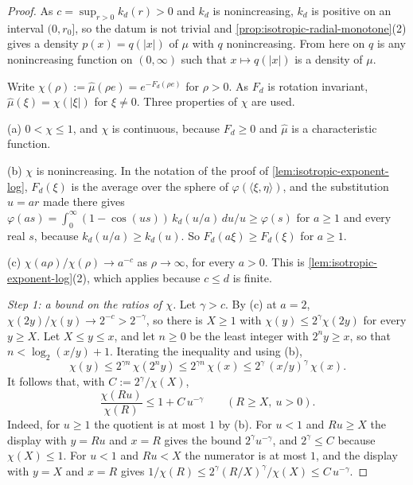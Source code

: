 \begin{proof}
\leanok
As $c = \sup_{r>0}k_d(r) > 0$ and $k_d$ is nonincreasing, $k_d$ is positive on an interval
$(0,r_0]$, so the datum is not trivial and \ref{prop:isotropic-radial-monotone}(2) gives a density
$p(x) = q(|x|)$ of $\mu$ with $q$ nonincreasing. From here on $q$ is any nonincreasing function
on $(0,\infty)$ such that $x \mapsto q(|x|)$ is a density of $\mu$.

Write $\chi(\rho) := \widehat\mu(\rho e) = e^{-F_d(\rho e)}$ for $\rho > 0$. As $F_d$ is rotation
invariant, $\widehat\mu(\xi) = \chi(|\xi|)$ for $\xi \ne 0$. Three properties of $\chi$ are used.

(a) $0 < \chi \le 1$, and $\chi$ is continuous, because $F_d \ge 0$ and $\widehat\mu$ is a
characteristic function.

(b) $\chi$ is nonincreasing. In the notation of the proof of
\ref{lem:isotropic-exponent-log}, $F_d(\xi)$ is the average over the sphere of
$\varphi(\langle\xi,\eta\rangle)$, and the substitution $u = ar$ made there gives
$\varphi(as) = \int_0^\infty(1 - \cos(us))\,k_d(u/a)\,du/u \ge \varphi(s)$ for $a \ge 1$ and every
real $s$, because $k_d(u/a) \ge k_d(u)$. So $F_d(a\xi) \ge F_d(\xi)$ for $a \ge 1$.

(c) $\chi(a\rho)/\chi(\rho) \to a^{-c}$ as $\rho \to \infty$, for every $a > 0$. This is
\ref{lem:isotropic-exponent-log}(2), which applies because $c \le d$ is finite.

\emph{Step 1: a bound on the ratios of $\chi$.} Let $\gamma > c$. By (c) at $a = 2$,
$\chi(2y)/\chi(y) \to 2^{-c} > 2^{-\gamma}$, so there is $X \ge 1$ with
$\chi(y) \le 2^{\gamma}\chi(2y)$ for every $y \ge X$. Let $X \le y \le x$, and let $n \ge 0$ be the
least integer with $2^n y \ge x$, so that $n < \log_2(x/y) + 1$. Iterating the inequality and
using (b),
\[
  \chi(y) \le 2^{\gamma n}\,\chi(2^n y) \le 2^{\gamma n}\,\chi(x)
   \le 2^{\gamma}\,(x/y)^{\gamma}\,\chi(x) .
\]
It follows that, with $C := 2^{\gamma}/\chi(X)$,
\begin{equation}\label{eq:rate-ratio-bound}
  \frac{\chi(Ru)}{\chi(R)} \le 1 + C\,u^{-\gamma} \qquad (R \ge X,\ u > 0) .
\end{equation}
Indeed, for $u \ge 1$ the quotient is at most $1$ by (b). For $u < 1$ and $Ru \ge X$ the display
with $y = Ru$ and $x = R$ gives the bound $2^{\gamma}u^{-\gamma}$, and $2^{\gamma} \le C$ because
$\chi(X) \le 1$. For $u < 1$ and $Ru < X$ the numerator is at most $1$, and the display with
$y = X$ and $x = R$ gives $1/\chi(R) \le 2^{\gamma}(R/X)^{\gamma}/\chi(X) \le C\,u^{-\gamma}$.


\end{proof}
